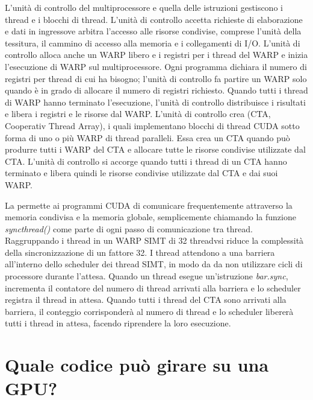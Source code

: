 L'unità di controllo del multiprocessore e quella delle istruzioni gestiscono i thread e i blocchi di thread. L'unità di controllo accetta richieste di elaborazione e dati in ingressove arbitra l'accesso alle risorse condivise, comprese l'unità della tessitura, il cammino di accesso alla memoria e i collegamenti di I/O. L'unità di controllo alloca anche un WARP libero e i registri per i thread del WARP e inizia l'esecuzione di WARP sul multiprocessore. Ogni programma dichiara il numero di registri per thread di cui ha bisogno; l'unità di controllo fa partire  un WARP solo quando è in grado di allocare il numero di registri richiesto. Quando tutti i thread di WARP hanno terminato l'esecuzione, l'unità di controllo distribuisce i risultati e libera i registri e le risorse dal WARP.  L'unità di controllo crea  (CTA, Cooperativ Thread Array), i quali implementano blocchi di thread CUDA sotto forma di uno o più WARP di thread paralleli. Essa crea un CTA quando può produrre tutti i WARP del CTA e allocare tutte le risorse condivise utilizzate dal CTA. L'unità di controllo si accorge quando tutti i thread di un CTA hanno terminato e libera quindi le risorse condivise utilizzate dal CTA e dai suoi WARP. 

La  permette ai programmi CUDA di comunicare frequentemente attraverso la memoria condivisa e la memoria globale, semplicemente chiamando la funzione \textit{syncthread()} come parte di ogni passo di comunicazione tra thread. Raggruppando i thread in un WARP SIMT di 32 threadvsi riduce la complessità della sincronizzazione di un fattore 32. I thread attendono a una barriera all'interno dello scheduler dei thread SIMT, in modo da da non utilizzare cicli di processore durante l'attesa. Quando un thread esegue un'istruzione \textit{bar.sync}, incrementa il contatore del numero di thread arrivati alla barriera e lo scheduler registra il thread in attesa. Quando tutti i thread del CTA sono arrivati alla barriera, il conteggio corrisponderà al numero di thread e lo scheduler libererà tutti i thread in attesa, facendo riprendere la loro esecuzione.


\section{Quale codice può girare su una GPU?}

